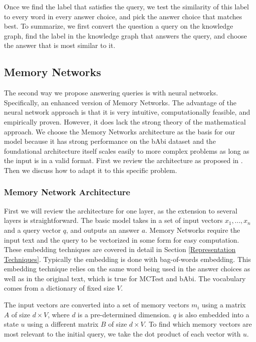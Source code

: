 \documentclass[pageno]{final_paper}
\begin{document}
Once we find the label that satisfies the query, we test the similarity of this
label to every word in every answer choice, and pick the answer choice that
matches best. To summarize, we first convert the question a query on the
knowledge graph, find the label in the knowledge graph that answers the query,
and choose the answer that is most similar to it.

\subsection{Memory Networks}
\label{Memory Networks}

The second way we propose answering queries is with neural networks.
Specifically, an enhanced version of Memory Networks. The advantage of the
neural network approach is that it is very intuitive, computationally feasible,
and empirically proven. However, it does lack the strong theory of the
mathematical approach. We choose the Memory Networks architecture as the basis
for our model because it has strong performance on the bAbi dataset and the
foundational architecture itself scales easily to more complex problems as long
as the input is in a valid format. First we review the architecture as proposed
in \cite{Sukhbaatar2015}. Then we discuss how to adapt it to this specific
problem. \\

\subsubsection{Memory Network Architecture}
\label{Memory Network Architecture}

First we will review the architecture for one layer, as the extension to several
layers is straightforward. The basic model takes in a set of input vectors $x_1, ...,
x_n$ and a query vector $q$, and outputs an answer $a$. Memory Networks require
the input text and the query to be vectorized in some form for easy computation.
These embedding techniques are covered in detail in Section \ref{Representation
Techniques}. Typically the embedding is done with bag-of-words embedding. This
embedding technique relies on the same word being used in the answer choices as
well as in the original text, which is true for MCTest and bAbi. The vocabulary
comes from a dictionary of fixed size $V$.

The input vectors are converted into a set of memory vectors ${m_i}$ using a
matrix $A$ of size $d\times V$, where $d$ is a pre-determined dimension. $q$ is
also embedded into a state $u$ using a different matrix $B$ of size $d\times V$.
To find which memory vectors are most relevant to the initial query, we take the
dot product of each vector with $u$.
\end{document}
